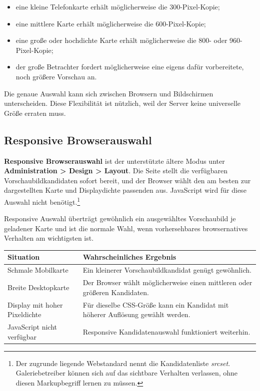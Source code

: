 \documentclass[11pt,a4paper]{article}
\newcommand{\ui}[1]{\textbf{#1}}
\begin{document}
\begin{itemize}
  \item eine kleine Telefonkarte erhält möglicherweise die 300-Pixel-Kopie;
  \item eine mittlere Karte erhält möglicherweise die 600-Pixel-Kopie;
  \item eine große oder hochdichte Karte erhält möglicherweise die 800- oder
  960-Pixel-Kopie;
  \item der große Betrachter fordert möglicherweise eine eigens dafür
  vorbereitete, noch größere Vorschau an.
\end{itemize}

Die genaue Auswahl kann sich zwischen Browsern und Bildschirmen unterscheiden.
Diese Flexibilität ist nützlich, weil der Server keine universelle Größe erraten
muss.

\subsection{Responsive Browserauswahl}

\ui{Responsive Browserauswahl} ist der unterstützte ältere Modus unter
\ui{Administration > Design > Layout}. Die Seite stellt die verfügbaren
Vorschaubildkandidaten sofort bereit, und der Browser wählt den am besten zur
dargestellten Karte und Displaydichte passenden aus. JavaScript wird für diese
Auswahl nicht benötigt.\footnote{Der zugrunde liegende Webstandard nennt die
Kandidatenliste \emph{srcset}. Galeriebetreiber können sich auf das sichtbare
Verhalten verlassen, ohne diesen Markupbegriff lernen zu müssen.}

Responsive Auswahl überträgt gewöhnlich ein ausgewähltes Vorschaubild je
geladener Karte und ist die normale Wahl, wenn vorhersehbares browsernatives
Verhalten am wichtigsten ist.

\begin{tabularx}{\textwidth}{>{\RaggedRight\arraybackslash}p{} X}
\toprule
\textbf{Situation} & \textbf{Wahrscheinliches Ergebnis}\\
\midrule
Schmale Mobilkarte & Ein kleinerer Vorschaubildkandidat genügt gewöhnlich.\\
Breite Desktopkarte & Der Browser wählt möglicherweise einen mittleren oder
größeren Kandidaten.\\
Display mit hoher Pixeldichte & Für dieselbe CSS-Größe kann ein Kandidat mit
höherer Auflösung gewählt werden.\\
JavaScript nicht verfügbar & Responsive Kandidatenauswahl funktioniert
weiterhin.\\
\bottomrule
\end{tabularx}
\end{document}
